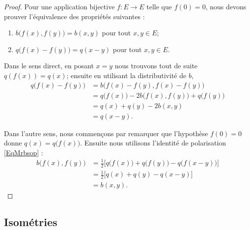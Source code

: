 \begin{proof}
	Pour une application bijective \( f\colon E\to E\) telle que \( f(0)=0\), nous devons prouver l'équivalence des propriétés suivantes :
	\begin{enumerate}
		\item
		      \( b\big( f(x),f(y) \big)=b(x,y)\) pour tout \( x,y\in E\);
		\item
		      \( q\big( f(x)-f(y) \big)=q(x-y)\) pour tout \( x,y\in E\).
	\end{enumerate}

	Dans le sens direct, en posant \( x=y\) nous trouvons tout de suite \( q(f(x))=q(x)\); ensuite en utilisant la distributivité de \( b\),
	\begin{subequations}
		\begin{align}
			q\big( f(x)-f(y) \big) & =b\big( f(x)-f(y),f(x)-f(y) \big)                            \\
			                       & =q\big( f(x) \big)-2b\big( f(x),f(y) \big)+q\big( f(y) \big) \\
			                       & =q(x)+q(y)-2b(x,y)                                           \\
			                       & =q(x-y).
		\end{align}
	\end{subequations}

	Dans l'autre sens, nous commençons par remarquer que l'hypothèse \( f(0)=0\) donne \( q(x)=q\big( f(x) \big)\). Ensuite nous utilisons l'identité de polarisation \eqref{EqMrbsop} :
	\begin{subequations}
		\begin{align}
			b\big( f(x),f(y) \big) & =\frac{ 1 }{2}\big[ q\big( f(x) \big)+q\big( f(y) \big)-q\big( f(x-y) \big) \big] \\
			                       & =\frac{ 1 }{2}\big[ q(x)+q(y)-q(x-y) \big]                                        \\
			                       & =b(x,y).
		\end{align}
	\end{subequations}
\end{proof}

\subsection{Isométries}

